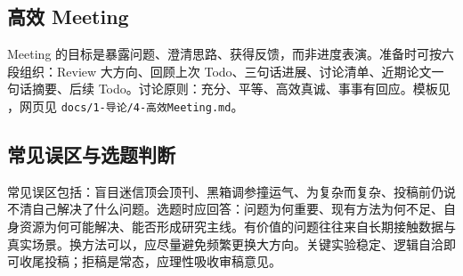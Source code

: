\subsection{高效 Meeting}
Meeting 的目标是暴露问题、澄清思路、获得反馈，而非进度表演。准备时可按六段组织：Review 大方向、回顾上次 Todo、三句话进展、讨论清单、近期论文一句话摘要、后续 Todo。讨论原则：充分、平等、高效真诚、事事有回应。模板见 ，网页见 \texttt{docs/1-导论/4-高效Meeting.md}。

\subsection{常见误区与选题判断}
常见误区包括：盲目迷信顶会顶刊、黑箱调参撞运气、为复杂而复杂、投稿前仍说不清自己解决了什么问题。选题时应回答：问题为何重要、现有方法为何不足、自身资源为何可能解决、能否形成研究主线。有价值的问题往往来自长期接触数据与真实场景。换方法可以，应尽量避免频繁更换大方向。关键实验稳定、逻辑自洽即可收尾投稿；拒稿是常态，应理性吸收审稿意见。
